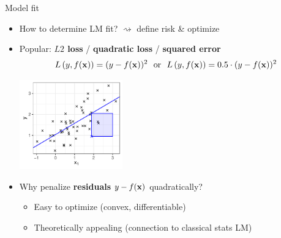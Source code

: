 \documentclass[11pt,compress,t,notes=noshow, xcolor=table]{beamer}
\begin{document}
\begin{frame}{Model fit}

\begin{itemize}
    \item How to determine LM fit? $\rightsquigarrow$ define risk \& optimize
    \item Popular: \textbf{$L2$ loss} / \textbf{quadratic loss} / 
    \textbf{squared error}
    $$L\left(y, f(\mathbf{x})\right) = (y-f(\mathbf{x}))^2 ~~ \text{or} ~~ L\left(y, f(\mathbf{x})\right) = 0.5 \cdot (y-f(\mathbf{x}))^2$$
    
    \includegraphics[width=0.35\textwidth]{figure/reg_l2_residual.pdf}
    \item Why penalize \textbf{residuals} $y - f(\mathbf{x})$ quadratically?
    \begin{itemize}
        \item Easy to optimize (convex, differentiable)
        \item Theoretically appealing (connection to classical stats LM)
    \end{itemize}
\end{itemize}

\end{frame}

\end{document}
